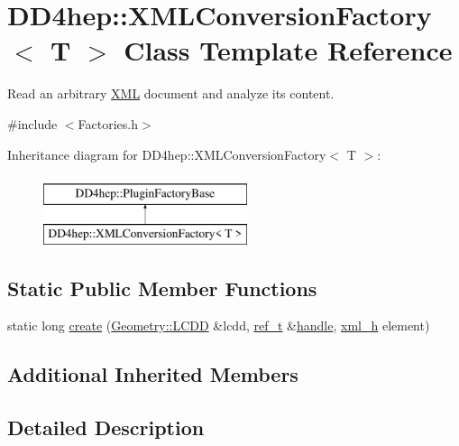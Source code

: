 \hypertarget{class_d_d4hep_1_1_x_m_l_conversion_factory}{}\section{D\+D4hep\+:\+:X\+M\+L\+Conversion\+Factory$<$ T $>$ Class Template Reference}
\label{class_d_d4hep_1_1_x_m_l_conversion_factory}


Read an arbitrary \hyperlink{namespace_d_d4hep_1_1_x_m_l}{X\+ML} document and analyze it\textquotesingle{}s content.  




{\ttfamily \#include $<$Factories.\+h$>$}

Inheritance diagram for D\+D4hep\+:\+:X\+M\+L\+Conversion\+Factory$<$ T $>$\+:\begin{figure}[H]
\begin{center}
\leavevmode
\includegraphics[height=2.000000cm]{class_d_d4hep_1_1_x_m_l_conversion_factory}
\end{center}
\end{figure}
\subsection*{Static Public Member Functions}
\begin{DoxyCompactItemize}
\item 
static long \hyperlink{class_d_d4hep_1_1_x_m_l_conversion_factory_af1d0a581aaec7bc8a40aeb01e6b2929e}{create} (\hyperlink{class_d_d4hep_1_1_geometry_1_1_l_c_d_d}{Geometry\+::\+L\+C\+DD} \&lcdd, \hyperlink{struct_d_d4hep_1_1_plugin_factory_base_ab13458952a5b4a91f5130d3ee4db4d33}{ref\+\_\+t} \&\hyperlink{_geant4_converter_8cpp_a3789cd8800e1433fb917a1d6f85ef67d}{handle}, \hyperlink{struct_d_d4hep_1_1_plugin_factory_base_aedebe6835e2705756763812545bcb8fd}{xml\+\_\+h} element)
\end{DoxyCompactItemize}
\subsection*{Additional Inherited Members}


\subsection{Detailed Description}
